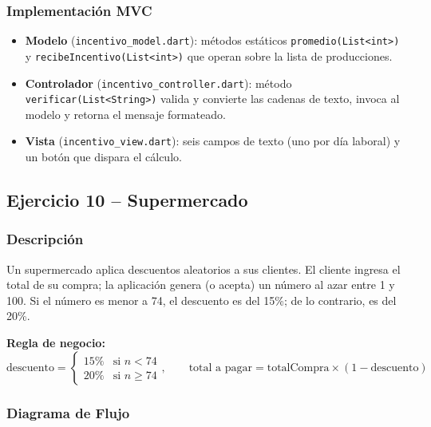 \documentclass[12pt,a4paper]{article}
\begin{document}
\subsubsection{Implementación MVC}

\begin{itemize}
  \item \textbf{Modelo} (\texttt{incentivo\_model.dart}): métodos estáticos \texttt{promedio(List<int>)} y \texttt{recibeIncentivo(List<int>)} que operan sobre la lista de producciones.
  \item \textbf{Controlador} (\texttt{incentivo\_controller.dart}): método \texttt{verificar(List<String>)} valida y convierte las cadenas de texto, invoca al modelo y retorna el mensaje formateado.
  \item \textbf{Vista} (\texttt{incentivo\_view.dart}): seis campos de texto (uno por día laboral) y un botón que dispara el cálculo.
\end{itemize}

\subsection{Ejercicio 10 -- Supermercado}

\subsubsection{Descripción}

Un supermercado aplica descuentos aleatorios a sus clientes. El cliente ingresa el total de su compra; la aplicación genera (o acepta) un número al azar entre 1 y 100. Si el número es menor a 74, el descuento es del 15\%; de lo contrario, es del 20\%.

\textbf{Regla de negocio:}
\[
  \text{descuento} = \begin{cases} 15\% & \text{si } n < 74 \\ 20\% & \text{si } n \geq 74 \end{cases},\qquad
  \text{total a pagar} = \text{totalCompra} \times (1 - \text{descuento})
\]

\subsubsection{Diagrama de Flujo}
\end{document}
